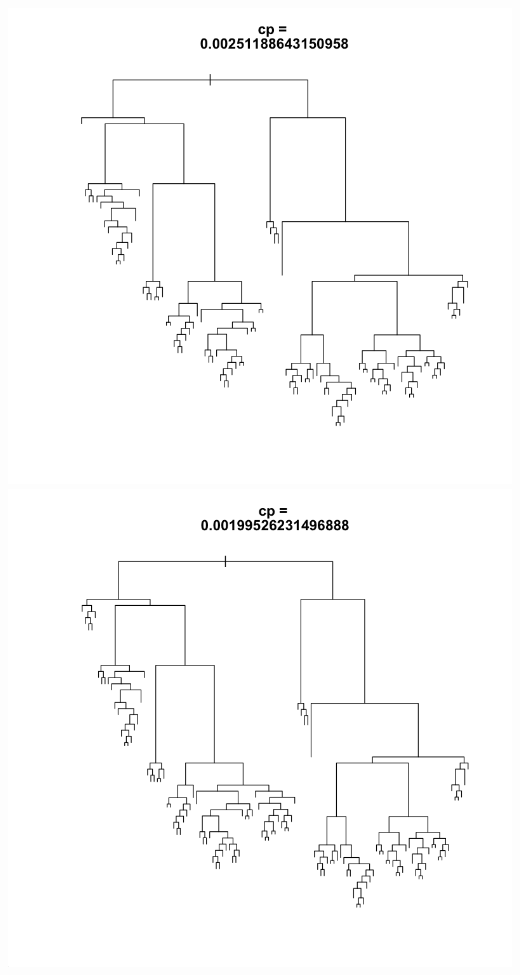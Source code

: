 \documentclass[11pt]{article}
\begin{document}
\begin{center}
\includegraphics[scale=0.25]{images/ctrl7}
\includegraphics[scale=0.25]{images/ctrl8}

\end{center}
\end{document}

